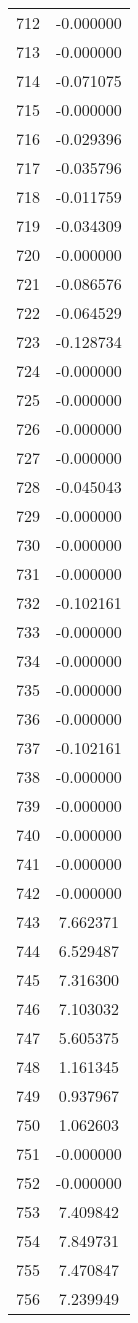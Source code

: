 \documentclass[12pt]{article}
\begin{document}
\begin{longtable}{@{}cc@{}}
712 & -0.000000 \\
713 & -0.000000 \\
714 & -0.071075 \\
715 & -0.000000 \\
716 & -0.029396 \\
717 & -0.035796 \\
718 & -0.011759 \\
719 & -0.034309 \\
720 & -0.000000 \\
721 & -0.086576 \\
722 & -0.064529 \\
723 & -0.128734 \\
724 & -0.000000 \\
725 & -0.000000 \\
726 & -0.000000 \\
727 & -0.000000 \\
728 & -0.045043 \\
729 & -0.000000 \\
730 & -0.000000 \\
731 & -0.000000 \\
732 & -0.102161 \\
733 & -0.000000 \\
734 & -0.000000 \\
735 & -0.000000 \\
736 & -0.000000 \\
737 & -0.102161 \\
738 & -0.000000 \\
739 & -0.000000 \\
740 & -0.000000 \\
741 & -0.000000 \\
742 & -0.000000 \\
743 & 7.662371 \\
744 & 6.529487 \\
745 & 7.316300 \\
746 & 7.103032 \\
747 & 5.605375 \\
748 & 1.161345 \\
749 & 0.937967 \\
750 & 1.062603 \\
751 & -0.000000 \\
752 & -0.000000 \\
753 & 7.409842 \\
754 & 7.849731 \\
755 & 7.470847 \\
756 & 7.239949 \\

\end{longtable}
\end{document}
